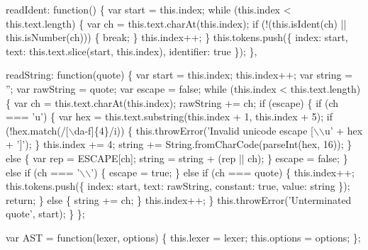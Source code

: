 \begin{DoxyCodeInclude}
{{  readIdent: \textcolor{keyword}{function}() \{
    var start = this.index;
    \textcolor{keywordflow}{while} (this.index < this.text.length) \{
      var ch = this.text.charAt(this.index);
      \textcolor{keywordflow}{if} (!(this.isIdent(ch) || this.isNumber(ch))) \{
        \textcolor{keywordflow}{break};
      \}
      this.index++;
    \}
    this.tokens.push(\{
      index: start,
      text: this.text.slice(start, this.index),
      identifier: \textcolor{keyword}{true}
    \});
  \},

  readString: \textcolor{keyword}{function}(quote) \{
    var start = this.index;
    this.index++;
    var \textcolor{keywordtype}{string} = \textcolor{stringliteral}{''};
    var rawString = quote;
    var escape = \textcolor{keyword}{false};
    \textcolor{keywordflow}{while} (this.index < this.text.length) \{
      var ch = this.text.charAt(this.index);
      rawString += ch;
      \textcolor{keywordflow}{if} (escape) \{
        \textcolor{keywordflow}{if} (ch === \textcolor{charliteral}{'u'}) \{
          var hex = this.text.substring(this.index + 1, this.index + 5);
          \textcolor{keywordflow}{if} (!hex.match(/[\(\backslash\)da-f]\{4\}/i)) \{
            this.throwError(\textcolor{stringliteral}{'Invalid unicode escape [\(\backslash\)\(\backslash\)u'} + hex + \textcolor{charliteral}{']'});
          \}
          this.index += 4;
          \textcolor{keywordtype}{string} += String.fromCharCode(parseInt(hex, 16));
        \} \textcolor{keywordflow}{else} \{
          var rep = ESCAPE[ch];
          \textcolor{keywordtype}{string} = \textcolor{keywordtype}{string} + (rep || ch);
        \}
        escape = \textcolor{keyword}{false};
      \} \textcolor{keywordflow}{else} \textcolor{keywordflow}{if} (ch === \textcolor{charliteral}{'\(\backslash\)\(\backslash\)'}) \{
        escape = \textcolor{keyword}{true};
      \} \textcolor{keywordflow}{else} \textcolor{keywordflow}{if} (ch === quote) \{
        this.index++;
        this.tokens.push(\{
          index: start,
          text: rawString,
          constant: \textcolor{keyword}{true},
          value: \textcolor{keywordtype}{string}
        \});
        \textcolor{keywordflow}{return};
      \} \textcolor{keywordflow}{else} \{
        \textcolor{keywordtype}{string} += ch;
      \}
      this.index++;
    \}
    this.throwError(\textcolor{stringliteral}{'Unterminated quote'}, start);
  \}
\};

var AST = \textcolor{keyword}{function}(lexer, options) \{
  this.lexer = lexer;
  this.options = options;
\};

}}
\end{DoxyCodeInclude}
